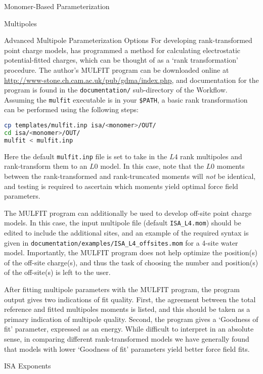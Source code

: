 \begin{section}{Monomer-Based Parameterization}
\begin{subsection}{Multipoles}
\begin{subsubsection}{Advanced Multipole Parameterization Options}
For developing rank-transformed point charge models, \citeauthor{Ferenczy1997} has
programmed a method for calculating electrostatic potential-fitted charges,
which can be thought of as a `rank transformation' procedure. The author's
MULFIT program can be 
downloaded online at
\url{http://www-stone.ch.cam.ac.uk/pub/gdma/index.php}, and documentation for
the program is found in the \verb|documentation/| sub-directory of the
Workflow. Assuming the \verb|mulfit| executable is in your \verb|$PATH|, a
basic rank transformation can be performed using the following steps:
%
\begin{lstlisting}[language=bash]
cp templates/mulfit.inp isa/<monomer>/OUT/
cd isa/<monomer>/OUT/
mulfit < mulfit.inp
\end{lstlisting}
%
Here the default \verb|mulfit.inp| file is set to take in the $L4$ rank
multipoles and rank-transform them to an $L0$ model. In this case, note that
the $L0$ moments between the rank-transformed and rank-truncated moments will
\emph{not} be identical, and testing is required to ascertain which
moments yield optimal force field parameters.

The MULFIT program can additionally be used to develop off-site point charge models. In
this case, the input multipole file (default \verb|ISA_L4.mom|) should be
edited to include the additional sites, and an example of the required syntax
is given in \verb|documentation/examples/ISA_L4_offsites.mom| for a
4-site water model. Importantly, the MULFIT program does not help
optimize the position(s) of the off-site charge(s), and thus the task of choosing
the number and position(s) of the off-site(s) is left to
the user.

After fitting multipole parameters with the MULFIT program, the program output
gives two indications of fit quality. First, the agreement between the total
reference and fitted multipoles moments is listed, and this should be taken as
a primary indication of multipole quality. Second, the program gives a
`Goodness of fit' parameter, expressed as an energy. While difficult to
interpret in an absolute sense, in comparing different rank-transformed models
we have generally found that models with lower `Goodness of fit' parameters
yield better force field fits.

\end{subsubsection}
\end{subsection}

\begin{subsection}{ISA Exponents}
\label{sec:workflow-exponents}


\end{subsection}
\end{section}

